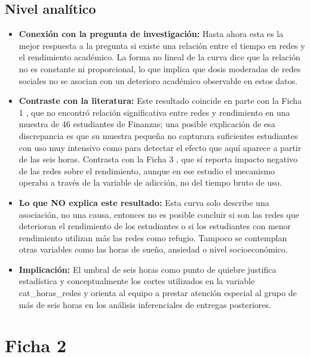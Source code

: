 \documentclass[12pt]{article}
\begin{document}
\subsection*{Nivel analítico}
\begin{itemize}
    \item \textbf{Conexión con la pregunta de investigación:} Hasta ahora esta es la mejor respuesta a la pregunta si existe una relación entre el tiempo en redes y el rendimiento académico. La forma no lineal de la curva dice que la relación no es constante ni proporcional, lo que implica que dosis moderadas de redes sociales no se asocian con un deterioro académico observable en estos datos.
    \item \textbf{Contraste con la literatura:} Este resultado coincide en parte con la Ficha 1 \cite{leon2023}, que no encontró relación significativa entre redes y rendimiento en una muestra de 46 estudiantes de Finanzas; una posible explicación de esa discrepancia es que su muestra pequeña no capturara suficientes estudiantes con uso muy intensivo como para detectar el efecto que aquí aparece a partir de las seis horas. Contrasta con la Ficha 3 \cite{aljemely2020}, que sí reporta impacto negativo de las redes sobre el rendimiento, aunque en ese estudio el mecanismo operaba a través de la variable de adicción, no del tiempo bruto de uso.
    \item \textbf{Lo que NO explica este resultado:} Esta curva solo describe una asociación, no una causa, entonces no es posible concluir si son las redes que deterioran el rendimiento de los estudiantes o si los estudiantes con menor rendimiento utilizan más las redes como refugio. Tampoco se contemplan otras variables como las horas de sueño, ansiedad o nivel socioeconómico.
    \item \textbf{Implicación:} El umbral de seis horas como punto de quiebre justifica estadística y conceptualmente los cortes utilizados en la variable cat\_horas\_redes y orienta al equipo a prestar atención especial al grupo de más de seis horas en los análisis inferenciales de entregas posteriores.
\end{itemize}

\section*{Ficha 2}
\end{document}
